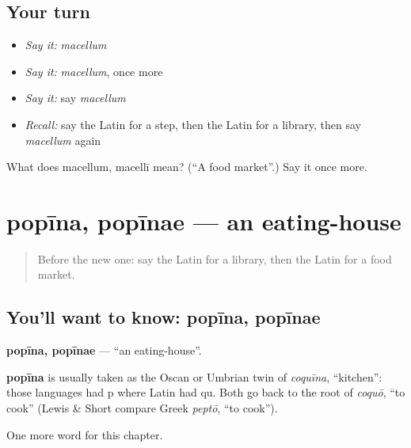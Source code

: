 \subsection*{Your turn}
\begin{itemize}
\raggedright
  \item \emph{Say it:} \emph{macellum}
  \item \emph{Say it:} \emph{macellum}, once more
  \item \emph{Say it:} say \emph{macellum}
  \item \emph{Recall:} say the Latin for a step, then the Latin for a library, then say \emph{macellum} again
\end{itemize}

\begin{tcolorbox}[breakable,colback=teal!4,colframe=teal!35!black,title={Before you move on}]
What does macellum, macellī mean? (\textquotedblleft{}A food market\textquotedblright{}.) Say it once more.
\end{tcolorbox}
\section[popīna, popīnae]{popīna, popīnae — an eating-house}

\label{lesson:LA-C117-popina}



\begin{quote}
Before the new one: say the Latin for a library, then the Latin for a food market.
\end{quote}

\subsection*{You'll want to know: popīna, popīnae}
\textbf{popīna, popīnae} — \textquotedblleft{}an eating-house\textquotedblright{}.

\begin{cousinweb}
\textbf{popīna} is usually taken as the Oscan or Umbrian twin of \emph{coquīna}, \textquotedblleft{}kitchen\textquotedblright{}: those languages had p where Latin had qu. Both go back to the root of \emph{coquō}, \textquotedblleft{}to cook\textquotedblright{} (Lewis \& Short compare Greek \emph{peptō}, \textquotedblleft{}to cook\textquotedblright{}).
\end{cousinweb}

\begin{grammarlens}[title={What you've built}]
One more word for this chapter.
\end{grammarlens}

